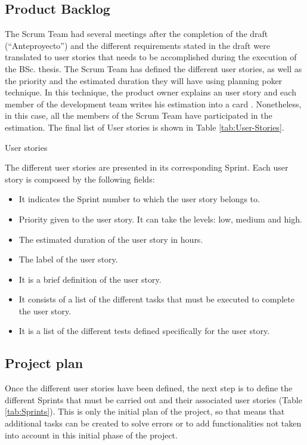\subsection{Product Backlog}
The Scrum Team had several meetings after the completion of the draft (“Anteproyecto”) and the different requirements stated in the draft were translated to user stories that needs to be accomplished during the execution of the BSc. thesis. The Scrum Team has defined the different user stories, as well as the priority and the estimated duration they will have using planning poker technique. In this technique, the product owner explains an user story and each member of the development team writes his estimation into a card \cite{Gar18}. Nonetheless, in this case, all the members of the Scrum Team have participated in the estimation. The final list of User stories is shown in Table \ref{tab:User-Stories}.

\begin{table}[hp]
	\centering
	{\small
		
	}
	\caption{User stories}
	\label{tab:User-Stories}
\end{table}
	
The different user stories are presented in its corresponding Sprint. Each user story is composed by the following fields:
\begin{itemize}
	\item {} It indicates the Sprint number to which the user story belongs to.
	\item {} Priority given to the user story. It can take the levels: low, medium and high.
	\item {} The estimated duration of the user story in hours. 
	\item {} The label of the user story.
	\item {} It is a brief definition of the user story.
	\item {} It consists of a list of the different tasks that must be executed to complete the user story.
	\item {} It is a list of the different tests defined specifically for the user story.
\end{itemize}

\subsection{Project plan}
Once the different user stories have been defined, the next step is to define the different Sprints that must be carried out and their associated user stories (Table \ref{tab:Sprints}). This is only the initial plan of the project, so that means that additional tasks can be created to solve errors or to add functionalities not taken into account in this initial phase of the project.

